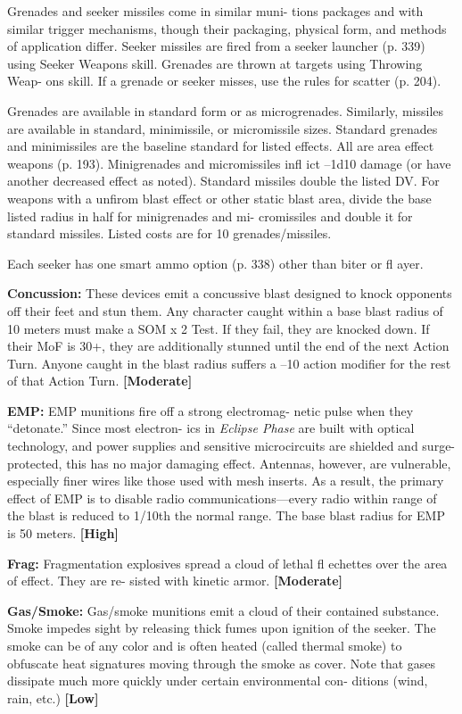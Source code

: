 Grenades and seeker missiles come in similar muni-
tions packages and with similar trigger mechanisms, 
though their packaging, physical form, and methods 
of application differ. Seeker missiles are fired from a 
seeker launcher (p. 339) using Seeker Weapons skill. 
Grenades are thrown at targets using Throwing Weap-
ons skill. If a grenade or seeker misses, use the rules 
for scatter (p. 204).

Grenades are available in standard form or as 
microgrenades. Similarly, missiles are available in 
standard, minimissile, or micromissile sizes. Standard 
grenades and minimissiles are the baseline standard 
for listed effects. All are area effect weapons (p. 193). 
Minigrenades and micromissiles infl ict –1d10 damage 
(or have another decreased effect as noted). Standard 
missiles double the listed DV. For weapons with a 
unfirom blast effect or other static blast area, divide 
the base listed radius in half for minigrenades and mi-
cromissiles and double it for standard missiles. Listed 
costs are for 10 grenades/missiles.

Each seeker has one smart ammo option (p. 338) 
other than biter or fl ayer.

\textbf{Concussion:} These devices emit a concussive blast 
designed to knock opponents off their feet and stun 
them. Any character caught within a base blast radius 
of 10 meters must make a SOM x 2 Test. If they fail, 
they are knocked down. If their MoF is 30+, they are 
additionally stunned until the end of the next Action 
Turn. Anyone caught in the blast radius suffers a 
–10 action modifier for the rest of that Action Turn. 
\textbf{[Moderate]}

\textbf{EMP:} EMP munitions fire off a strong electromag-
netic pulse when they ``detonate.'' Since most electron-
ics in \textit{Eclipse Phase} are built with optical technology, 
and power supplies and sensitive microcircuits are 
shielded and surge-protected, this has no major 
damaging effect. Antennas, however, are vulnerable, 
especially finer wires like those used with mesh inserts. 
As a result, the primary effect of EMP is to disable 
radio communications—every radio within range of 
the blast is reduced to 1/10th the normal range. The 
base blast radius for EMP is 50 meters. \textbf{[High]}

\textbf{Frag:} Fragmentation explosives spread a cloud of 
lethal fl echettes over the area of effect. They are re-
sisted with kinetic armor. \textbf{[Moderate]}

\textbf{Gas/Smoke:} Gas/smoke munitions emit a cloud of 
their contained substance. Smoke impedes sight by 
releasing thick fumes upon ignition of the seeker. The 
smoke can be of any color and is often heated (called 
thermal smoke) to obfuscate heat signatures moving 
through the smoke as cover. Note that gases dissipate 
much more quickly under certain environmental con-
ditions (wind, rain, etc.) \textbf{[Low]}

